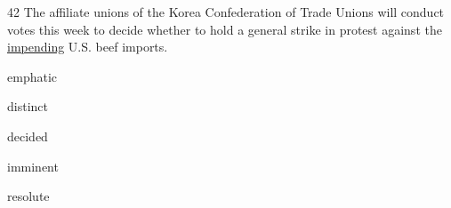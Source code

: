 \begin{question}{42}
The affiliate unions of the Korea Confederation of Trade Unions will conduct votes this week to decide whether to hold a general strike in protest against the \uline{impending} U.S. beef imports.
\begin{choices}
  \item emphatic
  \item distinct
  \item decided
  \item imminent
  \item resolute
\end{choices}
\end{question}
